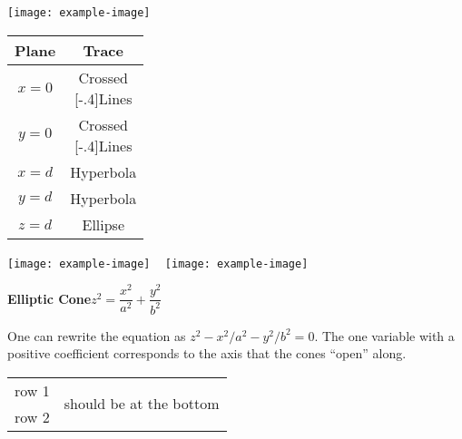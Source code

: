 \documentclass[10pt]{book}
\newcommand{\myincludeasythree}[3]{\texttt{[image: example-image]}}
\begin{document}
\noindent
\begin{minipage}{\linewidth}
 \captionsetup{type=figure}%
 \noindent%
  \myincludeasythree{width=\linewidth,
3Droll=0,
3Dortho=0.0067,
3Dc2c=.68 .68 .25,
3Dcoo=0 0 0,
3Droo=150}{width=\linewidth}{figures/figquadric_cone_3D}
\hfill
  \begin{tabular}{cc}
   \textbf{Plane}  & \textbf{Trace} \\\midrule
   $x=0$ & \parbox{5em}{\centering Crossed\\[-.4\baselineskip]Lines}\medskip\\
   $y=0$ & \parbox{5em}{\centering Crossed\\[-.4\baselineskip]Lines}\bigskip\\
   $x=d$ & Hyperbola\\
   $y=d$ & Hyperbola\\
   $z=d$ & Ellipse
  \end{tabular}
\hfill
  \myincludeasythree{width=.8\marginparwidth,
3Droll=0,
3Dortho=0.0067,
3Dc2c=.68 .68 .25,
3Dcoo=0 0 0,
3Droo=150}{width=.8\marginparwidth}{figures/figquadric_coneb_3D}
~%
  \myincludeasythree{width=.8\marginparwidth,
3Droll=0,
3Dortho=0.0067,
3Dc2c=.68 .68 .25,
3Dcoo=0 0 0,
3Droo=150}{width=.8\marginparwidth}{figures/figquadric_conec_3D}
 \caption{\quad\textbf{Elliptic Cone}\qquad$z^2=\dfrac{x^2}{a^2}+\dfrac{y^2}{b^2}$}
 \label{fig_elliptic_cone}
 \bigskip
 \begin{minipage}{.75\linewidth}
  One can rewrite the equation as $z^2-x^2/a^2-y^2/{b^2} = 0$. The one variable with a positive coefficient corresponds to the axis that the cones ``open'' along. 
 \end{minipage}
\end{minipage}

\begin{tabular}{cc}
row 1 & \multirow{15}{*}{should be at the bottom} \\
row 2
\end{tabular}
\end{document}
